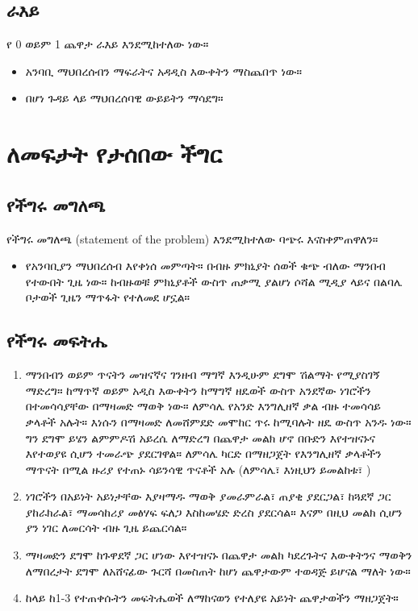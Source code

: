 \documentclass[a4paper,12pt]{article}
\newenvironment{geez}{\geezfont}{}
\begin{document}
\subsection{\begin{geez}ራእይ\end{geez}}
የ 0 ወይም 1 ጨዋታ ራእይ እንደሚከተለው ነው።
\begin{itemize}
\item አንባቢ ማህበረሰብን ማፍራትና አዳዲስ እውቀትን ማስጨበጥ ነው።
\item በሆነ ጉዳይ ላይ ማህበረሰባዊ ውይይትን ማሳደግ።
\end{itemize}
\section{\begin{geez}ለመፍታት የታሰበው ችግር\end{geez}}
\subsection{\begin{geez}የችግሩ መግለጫ\end{geez}}
የችግሩ መግለጫ (statement of the problem) እንደሚከተለው ባጭሩ እናስቀምጠዋለን።
\begin{itemize}
\item የአንባቢያን ማህበረሰብ እየቀነሰ መምጣት። በብዙ ምክኒያት ሰወች ቁጭ ብለው ማንበብ የተውበት ጊዜ ነው። ከብዙወቹ ምክኒያቶች ውስጥ ጠቃሚ ያልሆነ ሶሻል ሚዲያ ላይና በልባሌ ቦታወች ጊዜን ማጥፋት የተለመደ ሆኗል።
\end{itemize}
\subsection{\begin{geez}የችግሩ መፍትሔ\end{geez}}
\begin{enumerate}
\item ማንበብን ወይም ጥናትን መዝናኛና ገንዘብ ማግኛ እንዲሁም ደግሞ ሽልማት የሚያስገኝ ማድረግ። ከማጥኛ ወይም አዲስ እውቀትን ከማግኛ  ዘዴወች ውስጥ አንደኛው ነገሮችን በተመሳሳያቸው በማዛመድ ማወቅ ነው። ለምሳሌ የአንድ እንግሊዘኛ ቃል ብዙ ተመሳሳይ ቃላቶች አሉት። እነሱን በማዛመድ ለመሸምደድ መሞከር ጥሩ ከሚባሉት ዘዴ ውስጥ አንዱ ነው። ግን ደግሞ ይሄን ልምምዶሽ አይረሴ ለማድረግ በጨዋታ መልክ ሆኖ በቡድን እየተዝናኑና እየተወያዩ ሲሆን ተመራጭ ያደርገዋል። 
 ለምሳሌ ካርድ በማዘጋጀት የእንግሊዘኛ ቃላቶችን ማጥናት በሚል ዙሪያ የተጠኑ ሳይንሳዊ ጥናቶች አሉ (ለምሳሌ፣ እነዚህን ይመልከቱ፣ \cite{aslan2011teaching,azabdaftari2012comparing,bryson2012using,kosim2013improving,
 nikoopour2014vocabulary,
nugroho2012improving,
saputri2017improving,senzaki2017reinventing,sitompul2013teaching,
wahyuni2014flashcards}) 
\item ነገሮችን በአይነት አይነታቸው እያዛማዱ ማወቅ ያመራምራል፣ ጠያቂ ያደርጋል፣ ከጓደኛ ጋር ያከራክራል፣ ማመሳከሪያ መፅሃፍ ፍለጋ እስከመሄድ ድረስ ያደርሳል። እናም በዚህ መልክ ሲሆን ያን ነገር ለመርሳት ብዙ ጊዜ ይጨርሳል። 
\item ማዛመድን ደግሞ ከጉዋደኛ ጋር ሆነው እየተዝናኑ በጨዋታ መልክ ካደረጉትና እውቀትንና ማወቅን ለማበረታት ደግሞ ለአሸናፊው ጉርሻ በመስጠት ከሆነ ጨዋታውም ተወዳጅ ይሆናል ማለት ነው።
\item ከላይ ከ1-3 የተጠቀሱትን መፍትሔወች ለማከናወን የተለያዩ አይነት ጨዋታወችን ማዘጋጀት። 
\end{enumerate}
\end{document}
